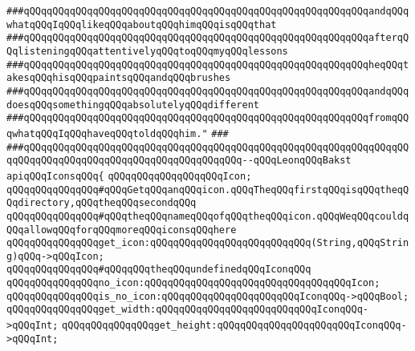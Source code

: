 \verb|###qQQqqQQqqQQqqQQqqQQqqQQqqQQqqQQqqQQqqQQqqQQqqQQqqQQqqQQqqQQqandqQQqwhatqQQqIqQQqlikeqQQqaboutqQQqhimqQQqisqQQqthat|\newline
\verb|###qQQqqQQqqQQqqQQqqQQqqQQqqQQqqQQqqQQqqQQqqQQqqQQqqQQqqQQqqQQqafterqQQqlisteningqQQqattentivelyqQQqtoqQQqmyqQQqlessons|\newline
\verb|###qQQqqQQqqQQqqQQqqQQqqQQqqQQqqQQqqQQqqQQqqQQqqQQqqQQqqQQqqQQqheqQQqtakesqQQqhisqQQqpaintsqQQqandqQQqbrushes|\newline
\verb|###qQQqqQQqqQQqqQQqqQQqqQQqqQQqqQQqqQQqqQQqqQQqqQQqqQQqqQQqqQQqandqQQqdoesqQQqsomethingqQQqabsolutelyqQQqdifferent|\newline
\verb|###qQQqqQQqqQQqqQQqqQQqqQQqqQQqqQQqqQQqqQQqqQQqqQQqqQQqqQQqqQQqfromqQQqwhatqQQqIqQQqhaveqQQqtoldqQQqhim."|\newline
\verb|###|\newline
\verb|###qQQqqQQqqQQqqQQqqQQqqQQqqQQqqQQqqQQqqQQqqQQqqQQqqQQqqQQqqQQqqQQqqQQqqQQqqQQqqQQqqQQqqQQqqQQqqQQqqQQqqQQqqQQq--qQQqLeonqQQqBakst|\newline
\newline
\newline
\newline
\verb|apiqQQqIconsqQQq{|\newline
\newline
\verb|qQQqqQQqqQQqqQQqqQQqIcon;|\newline
\newline
\verb|qQQqqQQqqQQqqQQq#qQQqGetqQQqanqQQqicon.qQQqTheqQQqfirstqQQqisqQQqtheqQQqdirectory,qQQqtheqQQqsecondqQQq|\newline
\verb|qQQqqQQqqQQqqQQq#qQQqtheqQQqnameqQQqofqQQqtheqQQqicon.qQQqWeqQQqcouldqQQqallowqQQqforqQQqmoreqQQqiconsqQQqhere|\newline
\newline
\verb|qQQqqQQqqQQqqQQqget_icon:qQQqqQQqqQQqqQQqqQQqqQQqqQQq(String,qQQqString)qQQq->qQQqIcon;|\newline
\newline
\verb|qQQqqQQqqQQqqQQq#qQQqqQQqtheqQQqundefinedqQQqIconqQQq|\newline
\verb|qQQqqQQqqQQqqQQqno_icon:qQQqqQQqqQQqqQQqqQQqqQQqqQQqqQQqqQQqIcon;|\newline
\verb|qQQqqQQqqQQqqQQqis_no_icon:qQQqqQQqqQQqqQQqqQQqqQQqIconqQQq->qQQqBool;|\newline
\newline
\verb|qQQqqQQqqQQqqQQqget_width:qQQqqQQqqQQqqQQqqQQqqQQqqQQqIconqQQq->qQQqInt;|\newline
\verb|qQQqqQQqqQQqqQQqget_height:qQQqqQQqqQQqqQQqqQQqqQQqIconqQQq->qQQqInt;|\newline
